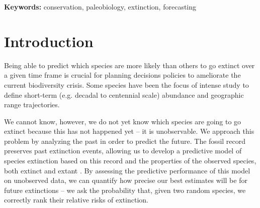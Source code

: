 \documentclass[12pt,letterpaper]{article}
\begin{document}
\begin{refsection}
\begin{abstract}
\end{abstract}

{\bf Keywords:} conservation, paleobiology, extinction, forecasting



\section{Introduction}

Being able to predict which species are more likely than others to go extinct over a given time frame is crucial for planning decisions policies to ameliorate the current biodiversity crisis. Some species have been the focus of intense study to define short-term (e.g. decadal to centennial scale) abundance and geographic range trajectories. 

We cannot know, however, we do not yet know which species are going to go extinct because this has not happened yet -- it is unobservable. We approach this problem by analyzing the past in order to predict the future. The fossil record preserves past extinction events, allowing us to develop a predictive model of species extinction based on this record and the properties of the observed species, both extinct and extant \citep{Harnik2012a,Finnegan2015}. By assessing the predictive performance of this model on unobserved data, we can quantify how precise our best estimates will be for future extinctions -- we ask the probability that, given two random species, we correctly rank their relative risks of extinction.


\end{refsection}
\end{document}
